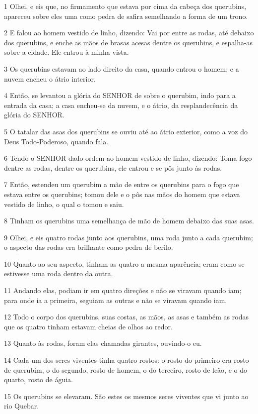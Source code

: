 \par 1 Olhei, e eis que, no firmamento que estava por cima da cabeça dos querubins, apareceu sobre eles uma como pedra de safira semelhando a forma de um trono.
\par 2 E falou ao homem vestido de linho, dizendo: Vai por entre as rodas, até debaixo dos querubins, e enche as mãos de brasas acesas dentre os querubins, e espalha-as sobre a cidade. Ele entrou à minha vista.
\par 3 Os querubins estavam ao lado direito da casa, quando entrou o homem; e a nuvem encheu o átrio interior.
\par 4 Então, se levantou a glória do SENHOR de sobre o querubim, indo para a entrada da casa; a casa encheu-se da nuvem, e o átrio, da resplandecência da glória do SENHOR.
\par 5 O tatalar das asas dos querubins se ouviu até ao átrio exterior, como a voz do Deus Todo-Poderoso, quando fala.
\par 6 Tendo o SENHOR dado ordem ao homem vestido de linho, dizendo: Toma fogo dentre as rodas, dentre os querubins, ele entrou e se pôs junto às rodas.
\par 7 Então, estendeu um querubim a mão de entre os querubins para o fogo que estava entre os querubins; tomou dele e o pôs nas mãos do homem que estava vestido de linho, o qual o tomou e saiu.
\par 8 Tinham os querubins uma semelhança de mão de homem debaixo das suas asas.
\par 9 Olhei, e eis quatro rodas junto aos querubins, uma roda junto a cada querubim; o aspecto das rodas era brilhante como pedra de berilo.
\par 10 Quanto ao seu aspecto, tinham as quatro a mesma aparência; eram como se estivesse uma roda dentro da outra.
\par 11 Andando elas, podiam ir em quatro direções e não se viravam quando iam; para onde ia a primeira, seguiam as outras e não se viravam quando iam.
\par 12 Todo o corpo dos querubins, suas costas, as mãos, as asas e também as rodas que os quatro tinham estavam cheias de olhos ao redor.
\par 13 Quanto às rodas, foram elas chamadas girantes, ouvindo-o eu.
\par 14 Cada um dos seres viventes tinha quatro rostos: o rosto do primeiro era rosto de querubim, o do segundo, rosto de homem, o do terceiro, rosto de leão, e o do quarto, rosto de águia.
\par 15 Os querubins se elevaram. São estes os mesmos seres viventes que vi junto ao rio Quebar.
